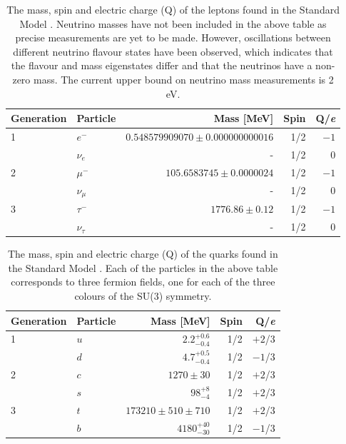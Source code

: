 \begin{table}[h!]
\centering
\begin{tabular}{l l r r r}
\hline
Generation & Particle & Mass [MeV] & Spin & Q/\textit{e} \\
\hline
1 & $e^{-}$ & $0.548579909070\pm0.000000000016$ & 1/2 & $-1$ \\
& $\nu_{e}$ & - & 1/2 & 0 \\
\hline
2 & $\mu^{-}$ & $105.6583745\pm0.0000024$ & 1/2 & $-1$ \\
& $\nu_{\mu}$ & - & 1/2 & 0 \\
\hline
3 & $\tau^{-}$ & $1776.86\pm0.12$ & 1/2 & $-1$ \\
& $\nu_{\tau}$ & - & 1/2 & 0 \\
\end{tabular}
\caption[The mass, spin and electric charge (Q) of the leptons found in the Standard Model \cite{Beringer:1900zz}.  Neutrino masses have not been included in the above table as precise measurements are yet to be made.  However, oscillations between different neutrino flavour states have been observed, which indicates that the flavour and mass eigenstates differ and that the neutrinos have a non-zero mass.  The current upper bound on neutrino mass measurements is 2 eV.]{The mass, spin and electric charge (Q) of the leptons found in the Standard Model \cite{Beringer:1900zz}.  Neutrino masses have not been included in the above table as precise measurements are yet to be made.  However, oscillations between different neutrino flavour states have been observed, which indicates that the flavour and mass eigenstates differ and that the neutrinos have a non-zero mass.  The current upper bound on neutrino mass measurements is 2 eV.}
\label{table:smleptons}
\end{table}
%
\begin{table}[h!]
\centering
\begin{tabular}{l l r r r}
\hline
Generation & Particle & Mass [MeV] & Spin & Q/\textit{e} \\
\hline
1 & $u$ & $2.2^{+0.6}_{-0.4}$ & 1/2 & $+2$/3 \\
 & $d$ & $4.7^{+0.5}_{-0.4}$ & 1/2 & $-1$/3 \\
\hline
2 & $c$ & $1270\pm30$ & 1/2 & $+2$/3 \\
 & $s$ & $98^{+8}_{-4}$ & 1/2 & $+2$/3 \\
\hline
3 & $t$ & $173210 \pm 510 \pm 710$ & 1/2 & $+2$/3 \\
 & $b$ & $4180^{+40}_{-30}$ & 1/2 & $-1$/3 \\
\end{tabular}
\caption[The mass, spin and electric charge (Q) of the quarks found in the Standard Model \cite{Beringer:1900zz}.  Each of the particles in the above table corresponds to three fermion fields, one for each of the three colours of the SU(3) symmetry.]{The mass, spin and electric charge (Q) of the quarks found in the Standard Model \cite{Beringer:1900zz}.  Each of the particles in the above table corresponds to three fermion fields, one for each of the three colours of the SU(3) symmetry.} 
\label{table:smquarks}
\end{table}
